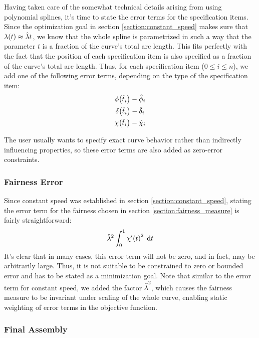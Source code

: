 \documentclass[a4paper]{article}
\begin{document}
				Having taken care of the somewhat technical details arising from using polynomial splines, it's time to state the error terms for the specification items. Since the optimization goal in section \ref{section:constant_speed} makes sure that \(\lambda\!\left( t \right) \approx \hat{\lambda}t\), we know that the whole spline is parametrized in such a way that the parameter \(t\) is a fraction of the curve's total arc length. This fits perfectly with the fact that the position of each specification item is also specified as a fraction of the curve's total arc length. Thus, for each specification item (\(0 \leq i \leq n\)), we add one of the following error terms, depending on the type of the specification item:
				\begin{equation*}
					\begin{gathered}
						\phi\!\left( \hat{t}_i \right) - \hat{\phi}_i\\
						\delta\!\left( \hat{t}_i \right) - \hat{\delta}_i\\
						\chi\!\left( \hat{t}_i \right) - \hat{\chi}_i
					\end{gathered}
				\end{equation*}

				The user usually wants to specify exact curve behavior rather than indirectly influencing properties, so these error terms are also added as zero-error constraints.

			\subsubsection{Fairness Error}
			\label{section:fairness_error}

				Since constant speed was established in section \ref{section:constant_speed}, stating the error term for the fairness chosen in section \ref{section:fairness_measure} is fairly straightforward:
				\begin{equation*}
					\hat{\lambda}^2\int_{0}^{1} \chi'\!\left( t \right)^2 \; \mathrm{d}t
				\end{equation*}
				It's clear that in many cases, this error term will not be zero, and in fact, may be arbitrarily large. Thus, it is not suitable to be constrained to zero or bounded error and has to be stated as a minimization goal. Note that similar to the error term for constant speed, we added the factor \(\hat{\lambda}^2\), which causes the fairness measure to be invariant under scaling of the whole curve, enabling static weighting of error terms in the objective function.

			\subsubsection{Final Assembly}
			\label{section:final_assembly}
\end{document}
